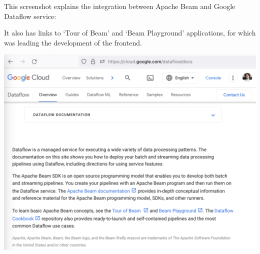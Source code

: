
This screenshot explains the integration between Apache Beam and Google Dataflow service:


It also has links to `Tour of Beam' and `Beam Playground' applications,
for which \mrl was leading the development of the frontend.

\includegraphics[width=\textwidth]{dataflow-docs}

\pagebreak
